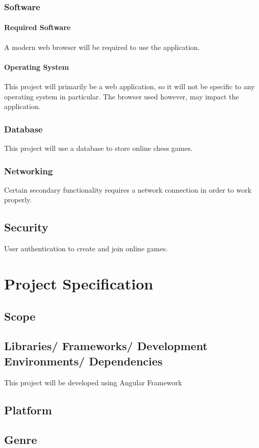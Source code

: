 \documentclass{article}
\begin{document}
\subsubsection{Software}
\paragraph{Required Software}
A modern web browser will be required to use the application.
\paragraph{Operating System}
This project will primarily be a web application, so it will not be specific to any operating system in particular. The browser used however, may impact the application.
\subsubsection{Database}
This project will use a database to store online chess games.
\subsubsection{Networking}
Certain secondary functionality requires a network connection in order to work properly.
\subsection{Security}
User authentication to create and join online games.


\newpage
\section{Project Specification}
\subsection{Scope}
\subsection{Libraries/ Frameworks/ Development Environments/ Dependencies}
This project will be developed using Angular Framework
\subsection{Platform}
\subsection{Genre}
\end{document}
